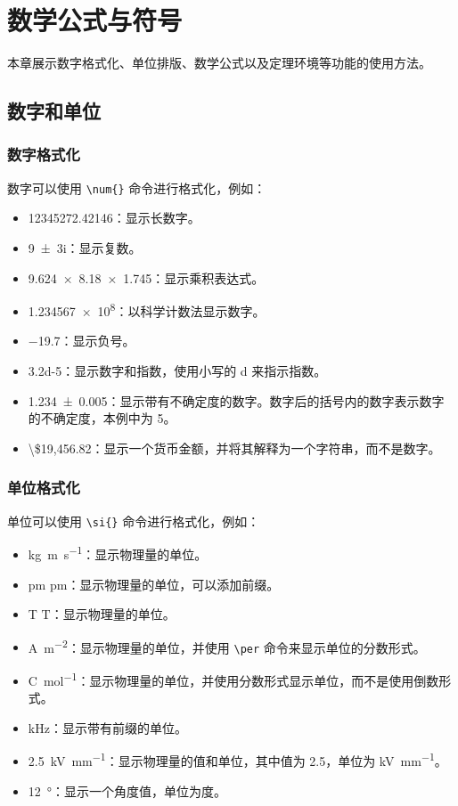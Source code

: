\chapter{数学公式与符号}\label{chap:math}

本章展示数字格式化、单位排版、数学公式以及定理环境等功能的使用方法。

\section{数字和单位}

\subsection{数字格式化}

数字可以使用 \verb|\num{}| 命令进行格式化，例如：

\begin{itemize}
  \item \num{12345272.42146}：显示长数字。
  \item \num{9+-3i}：显示复数。
  \item \num{9.624 x 8.18 x 1.745}：显示乘积表达式。
  \item \num{1.234567e8}：以科学计数法显示数字。
  \item \num{-19.7}：显示负号。
  \item \num{3.2d-5}：显示数字和指数，使用小写的 d 来指示指数。
  \item \num{1.234(5)}：显示带有不确定度的数字。数字后的括号内的数字表示数字的不确定度，本例中为 5。
  \item \num[parse-numbers=false]{\$19,456.82}：显示一个货币金额，并将其解释为一个字符串，而不是数字。
\end{itemize}

\subsection{单位格式化}

单位可以使用 \verb|\si{}| 命令进行格式化，例如：

\begin{itemize}
  \item \si{kg.m.s^{-1}}：显示物理量的单位。
  \item \si{\pico\meter} $\si{\pico\meter}$：显示物理量的单位，可以添加前缀。
  \item \si{\tesla} $\si{\tesla}$：显示物理量的单位。
  \item \si{\ampere\per\meter\squared}：显示物理量的单位，并使用 \verb|\per| 命令来显示单位的分数形式。
  \item \si[per-mode=fraction]{\coulomb\per\mole}：显示物理量的单位，并使用分数形式显示单位，而不是使用倒数形式。
  \item \si{\kilo\hertz}：显示带有前缀的单位。
  \item \SI{2.5}{\kilo\volt\per\milli\meter}：显示物理量的值和单位，其中值为 2.5，单位为 \si{\kilo\volt\per\milli\meter}。
  \item \SI{12}{\degree}：显示一个角度值，单位为度。
\end{itemize}

